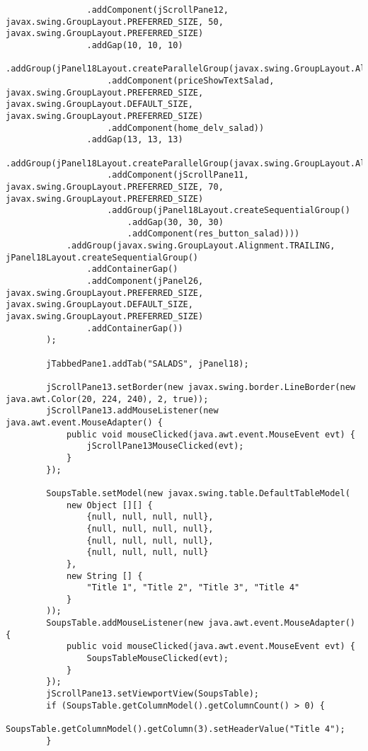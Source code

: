 \documentclass[12pt,a4paper]{article}
\begin{document}
\begin{lstlisting}
                .addComponent(jScrollPane12, javax.swing.GroupLayout.PREFERRED_SIZE, 50, javax.swing.GroupLayout.PREFERRED_SIZE)
                .addGap(10, 10, 10)
                .addGroup(jPanel18Layout.createParallelGroup(javax.swing.GroupLayout.Alignment.LEADING)
                    .addComponent(priceShowTextSalad, javax.swing.GroupLayout.PREFERRED_SIZE, javax.swing.GroupLayout.DEFAULT_SIZE, javax.swing.GroupLayout.PREFERRED_SIZE)
                    .addComponent(home_delv_salad))
                .addGap(13, 13, 13)
                .addGroup(jPanel18Layout.createParallelGroup(javax.swing.GroupLayout.Alignment.LEADING)
                    .addComponent(jScrollPane11, javax.swing.GroupLayout.PREFERRED_SIZE, 70, javax.swing.GroupLayout.PREFERRED_SIZE)
                    .addGroup(jPanel18Layout.createSequentialGroup()
                        .addGap(30, 30, 30)
                        .addComponent(res_button_salad))))
            .addGroup(javax.swing.GroupLayout.Alignment.TRAILING, jPanel18Layout.createSequentialGroup()
                .addContainerGap()
                .addComponent(jPanel26, javax.swing.GroupLayout.PREFERRED_SIZE, javax.swing.GroupLayout.DEFAULT_SIZE, javax.swing.GroupLayout.PREFERRED_SIZE)
                .addContainerGap())
        );

        jTabbedPane1.addTab("SALADS", jPanel18);

        jScrollPane13.setBorder(new javax.swing.border.LineBorder(new java.awt.Color(20, 224, 240), 2, true));
        jScrollPane13.addMouseListener(new java.awt.event.MouseAdapter() {
            public void mouseClicked(java.awt.event.MouseEvent evt) {
                jScrollPane13MouseClicked(evt);
            }
        });

        SoupsTable.setModel(new javax.swing.table.DefaultTableModel(
            new Object [][] {
                {null, null, null, null},
                {null, null, null, null},
                {null, null, null, null},
                {null, null, null, null}
            },
            new String [] {
                "Title 1", "Title 2", "Title 3", "Title 4"
            }
        ));
        SoupsTable.addMouseListener(new java.awt.event.MouseAdapter() {
            public void mouseClicked(java.awt.event.MouseEvent evt) {
                SoupsTableMouseClicked(evt);
            }
        });
        jScrollPane13.setViewportView(SoupsTable);
        if (SoupsTable.getColumnModel().getColumnCount() > 0) {
            SoupsTable.getColumnModel().getColumn(3).setHeaderValue("Title 4");
        }


\end{lstlisting}
\end{document}

